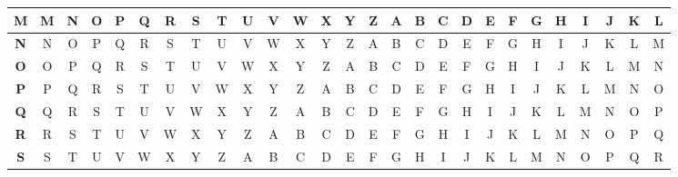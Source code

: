 \begin{table}[H]
\begin{tabular}{|c||c|c|c|c|c|c|c|c|c|c|c|c|c|c|c|c|c|c|c|c|c|c|c|c|c|c|}
							\textbf{M} & M          & N          & O          & P          & Q          & R          & S          & T          & U          & V          & W          & X          & Y          & Z          & A          & B          & C          & D          & E          & F          & G          & H          & I          & J          & K          & L          \\ \hline
							\textbf{N} & N          & O          & P          & Q          & R          & S          & T          & U          & V          & W          & X          & Y          & Z          & A          & B          & C          & D          & E          & F          & G          & H          & I          & J          & K          & L          & M          \\ \hline
							\textbf{O} & O          & P          & Q          & R          & S          & T          & U          & V          & W          & X          & Y          & Z          & A          & B          & C          & D          & E          & F          & G          & H          & I          & J          & K          & L          & M          & N          \\ \hline
							\textbf{P} & P          & Q          & R          & S          & T          & U          & V          & W          & X          & Y          & Z          & A          & B          & C          & D          & E          & F          & G          & H          & I          & J          & K          & L          & M          & N          & O          \\ \hline
							\textbf{Q} & Q          & R          & S          & T          & U          & V          & W          & X          & Y          & Z          & A          & B          & C          & D          & E          & F          & G          & H          & I          & J          & K          & L          & M          & N          & O          & P          \\ \hline
							\textbf{R} & R          & S          & T          & U          & V          & W          & X          & Y          & Z          & A          & B          & C          & D          & E          & F          & G          & H          & I          & J          & K          & L          & M          & N          & O          & P          & Q          \\ \hline
							\textbf{S} & S          & T          & U          & V          & W          & X          & Y          & Z          & A          & B          & C          & D          & E          & F          & G          & H          & I          & J          & K          & L          & M          & N          & O          & P          & Q          & R          \\ \hline

\end{tabular}
\end{table}
